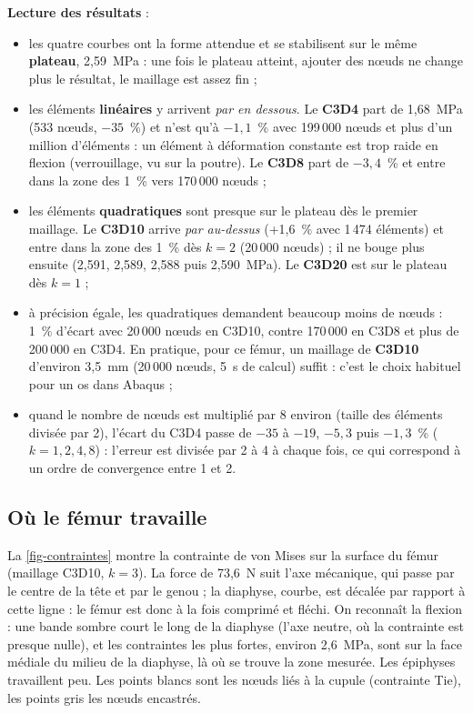 \documentclass[11pt,a4paper]{article}
\begin{document}
\textbf{Lecture des résultats} :
\begin{itemize}
  \item les quatre courbes ont la forme attendue et se stabilisent sur le même \textbf{plateau}, 2,59~MPa : une fois le
  plateau atteint, ajouter des nœuds ne change plus le résultat, le maillage est assez fin ;
  \item les éléments \textbf{linéaires} y arrivent \emph{par en dessous}. Le \textbf{C3D4} part de 1,68~MPa (533 nœuds,
  $-35$~\%) et n'est qu'à $-1{,}1$~\% avec 199\,000 nœuds et plus d'un million d'éléments : un élément à déformation
  constante est trop raide en flexion (verrouillage, vu sur la poutre). Le \textbf{C3D8} part de $-3{,}4$~\% et entre
  dans la zone des 1~\% vers 170\,000 nœuds ;
  \item les éléments \textbf{quadratiques} sont presque sur le plateau dès le premier maillage. Le \textbf{C3D10} arrive
  \emph{par au-dessus} (+1,6~\% avec 1\,474 éléments) et entre dans la zone des 1~\% dès $k = 2$ (20\,000 nœuds) ; il
  ne bouge plus ensuite (2,591, 2,589, 2,588 puis 2,590~MPa). Le \textbf{C3D20} est sur le plateau dès $k = 1$ ;
  \item à précision égale, les quadratiques demandent beaucoup moins de nœuds : 1~\% d'écart avec 20\,000 nœuds en
  C3D10, contre 170\,000 en C3D8 et plus de 200\,000 en C3D4. En pratique, pour ce fémur, un maillage de \textbf{C3D10}
  d'environ 3,5~mm (20\,000 nœuds, 5~s de calcul) suffit : c'est le choix habituel pour un os dans Abaqus ;
  \item quand le nombre de nœuds est multiplié par 8 environ (taille des éléments divisée par 2), l'écart du C3D4 passe
  de $-35$ à $-19$, $-5{,}3$ puis $-1{,}3$~\% ($k = 1, 2, 4, 8$) : l'erreur est divisée par 2 à 4 à chaque fois, ce qui
  correspond à un ordre de convergence entre 1 et 2.
\end{itemize}

\subsection{Où le fémur travaille}

La \cref{fig-contraintes} montre la contrainte de von Mises sur la surface du fémur (maillage C3D10, $k = 3$). La force
de 73,6~N suit l'axe mécanique, qui passe par le centre de la tête et par le genou ; la diaphyse, courbe, est décalée
par rapport à cette ligne : le fémur est donc à la fois comprimé et fléchi. On reconnaît la flexion : une bande sombre
court le long de la diaphyse (l'axe neutre, où la contrainte est presque nulle), et les contraintes les plus fortes,
environ 2,6~MPa, sont sur la face médiale du milieu de la diaphyse, là où se trouve la zone mesurée. Les épiphyses
travaillent peu. Les points blancs sont les nœuds liés à la cupule (contrainte Tie), les points gris les nœuds
encastrés.
\end{document}
